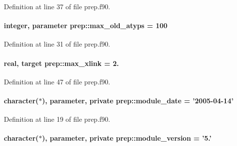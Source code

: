 Definition at line 37 of file prep.\-f90.

\hypertarget{classprep_aa395d2a6f28f4a82d4f7faef27010bae}{
\paragraph[{max\-\_\-old\-\_\-atyps}]{\setlength{\rightskip}{0pt plus 5cm}integer, parameter prep\-::max\-\_\-old\-\_\-atyps = 100}}\label{classprep_aa395d2a6f28f4a82d4f7faef27010bae}


Definition at line 31 of file prep.\-f90.

\hypertarget{classprep_a85c4693cbc15c5614620bcc7d837e763}{
\paragraph[{max\-\_\-xlink}]{\setlength{\rightskip}{0pt plus 5cm}real, target prep\-::max\-\_\-xlink = 2.}}\label{classprep_a85c4693cbc15c5614620bcc7d837e763}


Definition at line 47 of file prep.\-f90.

\hypertarget{classprep_a1e39aac67364bce4d4389f161fe8555e}{
\paragraph[{module\-\_\-date}]{\setlength{\rightskip}{0pt plus 5cm}character($\ast$), parameter, private prep\-::module\-\_\-date = '2005-\/04-\/14'\hspace{0.3cm}{\ttfamily [private]}}}\label{classprep_a1e39aac67364bce4d4389f161fe8555e}


Definition at line 19 of file prep.\-f90.

\hypertarget{classprep_af285bdd5135ab10225b55c9a2ed4d0d0}{
\paragraph[{module\-\_\-version}]{\setlength{\rightskip}{0pt plus 5cm}character($\ast$), parameter, private prep\-::module\-\_\-version = '5.'\hspace{0.3cm}{\ttfamily [private]}}}\label{classprep_af285bdd5135ab10225b55c9a2ed4d0d0}


